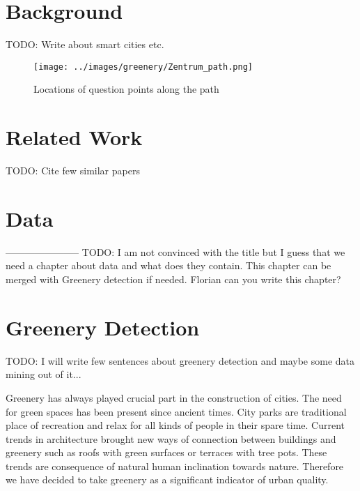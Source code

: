 \documentclass[letterpaper]{article}
\begin{document}
\section{Background}\label{sec:background}
TODO: Write about smart cities etc.

 \begin{figure}
	\centering
	\texttt{[image: ../images/greenery/Zentrum\_path.png]}
	\caption{Locations of question points along the path}
	\label{fig:path_points}
\end{figure}

\section{Related Work}
TODO: Cite few similar papers

\section{Data}
-----------------------
TODO: I am not convinced with the title but I guess that we need a chapter about data and what does they contain.
This chapter can be merged with Greenery detection if needed.
Florian can you write this chapter?

\section{Greenery Detection}\label{sec:greenery}
TODO: I will write few sentences about greenery detection and maybe some data mining out of it...

\indent Greenery has always played crucial part in the construction of cities. The need for green spaces has been present since ancient times. 
City parks are traditional place of recreation and relax for all kinds of people in their spare time. Current trends in architecture brought new ways of
connection between buildings and greenery such as roofs with green surfaces or terraces with tree pots. These trends are consequence of natural human inclination towards nature. Therefore we have decided to take greenery as a significant indicator of urban quality. 
\end{document}
